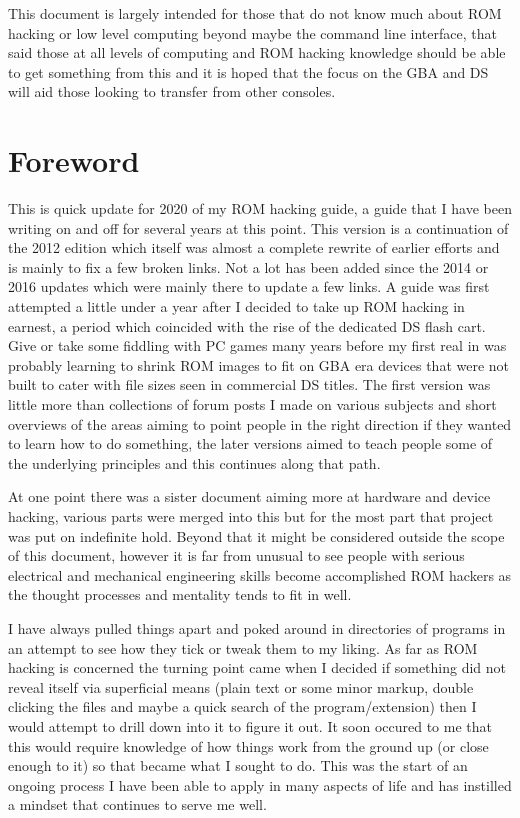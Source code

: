 \documentclass[
]{book}
\begin{document}
This document is largely intended for those that do not know much about ROM hacking or low level computing beyond maybe the command line interface, that said those at all levels of computing and ROM hacking knowledge should be able to get something from this and it is hoped that the focus on the GBA and DS will aid those looking to transfer from other consoles.

\hypertarget{foreword}{%
\section{Foreword}\label{foreword}}

This is quick update for 2020 of my ROM hacking guide, a guide that I have been writing on and off for several years at this point. This version is a continuation of the 2012 edition which itself was almost a complete rewrite of earlier efforts and is mainly to fix a few broken links. Not a lot has been added since the 2014 or 2016 updates which were mainly there to update a few links. A guide was first attempted a little under a year after I decided to take up ROM hacking in earnest, a period which coincided with the rise of the dedicated DS flash cart. Give or take some fiddling with PC games many years before my first real in was probably learning to shrink ROM images to fit on GBA era devices that were not built to cater with file sizes seen in commercial DS titles. The first version was little more than collections of forum posts I made on various subjects and short overviews of the areas aiming to point people in the right direction if they wanted to learn how to do something, the later versions aimed to teach people some of the underlying principles and this continues along that path.

At one point there was a sister document aiming more at hardware and device hacking, various parts were merged into this but for the most part that project was put on indefinite hold. Beyond that it might be considered outside the scope of this document, however it is far from unusual to see people with serious electrical and mechanical engineering skills become accomplished ROM hackers as the thought processes and mentality tends to fit in well.

I have always pulled things apart and poked around in directories of programs in an attempt to see how they tick or tweak them to my liking. As far as ROM hacking is concerned the turning point came when I decided if something did not reveal itself via superficial means (plain text or some minor markup, double clicking the files and maybe a quick search of the program/extension) then I would attempt to drill down into it to figure it out. It soon occured to me that this would require knowledge of how things work from the ground up (or close enough to it) so that became what I sought to do. This was the start of an ongoing process I have been able to apply in many aspects of life and has instilled a mindset that continues to serve me well.
\end{document}
